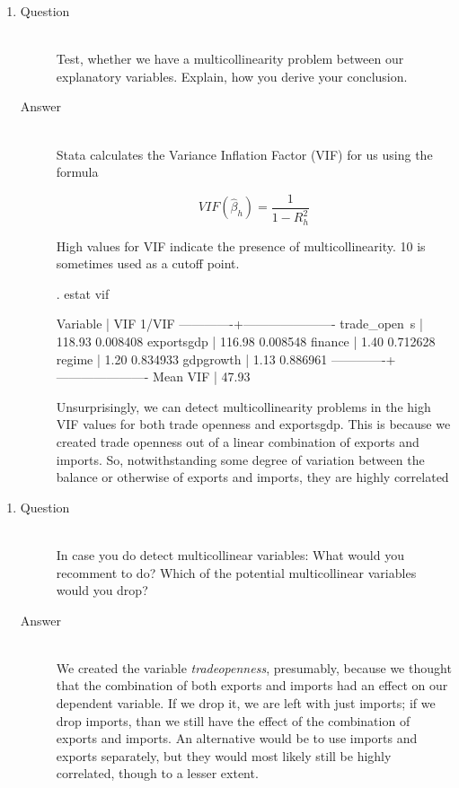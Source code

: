 \documentclass{article}
\begin{document}
  \begin{enumerate}[label=(\alph*)]
    \item 
    \begin{description}
      \item[Question] \hfill \\
      Test, whether we have a multicollinearity problem between our explanatory variables. Explain, how you derive your conclusion.
      \item[Answer] \hfill \\
      Stata calculates the Variance Inflation Factor (VIF) for us using the formula
      
      \[ VIF(\hat{\beta}_h) = \frac{1}{1-R^2_h} \]
      
      High values for VIF indicate the presence of multicollinearity. 10 is sometimes used as a cutoff point.
      
      \begin{CVerbatim}
. estat vif

    Variable |       VIF       1/VIF  
-------------+----------------------
trade_open~s |    118.93    0.008408
  exportsgdp |    116.98    0.008548
     finance |      1.40    0.712628
      regime |      1.20    0.834933
   gdpgrowth |      1.13    0.886961
-------------+----------------------
    Mean VIF |     47.93
      \end{CVerbatim}
      Unsurprisingly, we can detect multicollinearity problems in the high VIF values for both trade openness and exportsgdp. This is because we created trade openness out of a linear combination of exports and imports. So, notwithstanding some degree of variation between the balance or otherwise of exports and imports, they are highly correlated
    \end{description}
  \end{enumerate}
  
  \begin{enumerate}[label=(\alph*)]
    \item 
    \begin{description}
      \item[Question] \hfill \\
      In case you do detect multicollinear variables: What would you recomment to do? Which of the potential multicollinear variables would you drop?
      \item[Answer] \hfill \\
      We created the variable \textit{tradeopenness}, presumably, because we thought that the combination of both exports and imports had an effect on our dependent variable. If we drop it, we are left with just imports; if we drop imports, than we still have the effect of the combination of exports and imports. An alternative would be to use imports and exports separately, but they would most likely still be highly correlated, though to a lesser extent.
    \end{description}
  \end{enumerate}
  
\end{document}
